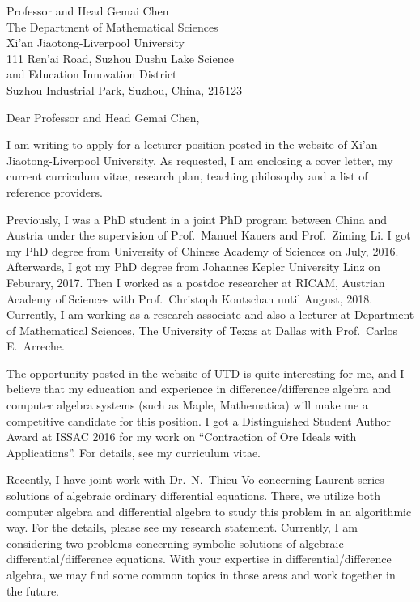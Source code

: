 \documentclass[11pt, a4paper]{letter} %
\begin{document}

\begin{letter}{
	Professor and Head Gemai Chen \\
	The Department of Mathematical Sciences\\
	Xi’an Jiaotong-Liverpool University\\
	111 Ren'ai Road, Suzhou Dushu Lake Science \\
	and Education Innovation District \\
	Suzhou Industrial Park, Suzhou, China, 215123
}


\opening{Dear Professor and Head Gemai Chen,}

I am writing to apply for a lecturer position posted in the website of Xi’an Jiaotong-Liverpool University. 
As requested, I am enclosing a cover letter, my current curriculum vitae, research plan, teaching philosophy and a list of reference providers. 

Previously, I was a PhD student in a joint PhD program between China and Austria under the supervision of Prof.\ Manuel Kauers and Prof.\ Ziming Li. 
I got my PhD degree from University of Chinese Academy of Sciences on July, 2016. 
Afterwards, I got my PhD degree from Johannes Kepler University Linz on Feburary, 2017. 
Then I worked as a postdoc researcher at RICAM, Austrian Academy of Sciences with Prof.\ Christoph Koutschan until August, 2018. Currently, 
I am working as a research associate and also a lecturer at Department of Mathematical Sciences, The University of Texas at Dallas with Prof.\ Carlos E.\ Arreche.

The opportunity posted in the website of UTD is quite interesting for me, 
and I believe that my education and experience in difference/difference algebra 
and computer algebra systems (such as Maple, Mathematica) will make me a competitive candidate for this position.
I got a Distinguished Student Author Award at ISSAC 2016 for my work on ``Contraction of Ore Ideals with Applications''. 
For details, see my curriculum vitae.

Recently, I have joint work with Dr.\ N.\ Thieu Vo concerning Laurent series solutions of algebraic ordinary differential equations. 
There, we utilize both computer algebra and differential algebra to study this problem in an algorithmic way. 
For the details, please see my research statement. 
Currently, I am considering two problems concerning symbolic solutions of algebraic differential/difference equations. 
With your expertise in differential/difference algebra, we may find some common topics in those areas and work together in the future. 


\end{letter}
\end{document}
